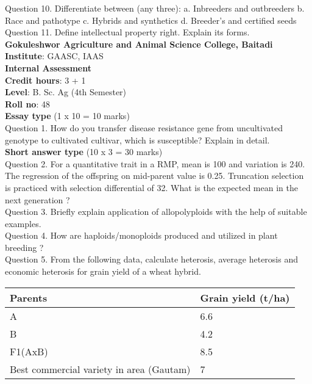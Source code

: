 \documentclass[12pt]{article}\usepackage[]{graphicx}\usepackage[]{color}
\begin{document}
Question 10. Differentiate between (any three): a. Inbreeders and outbreeders b. Race and pathotype c. Hybrids and synthetics d. Breeder's and certified seeds\\
Question 11. Define intellectual property right. Explain its forms.\\
\clearpage 
{\centering \Large{\textbf{Gokuleshwor Agriculture and Animal Science College, Baitadi}} \\[0.25cm]
            \textbf{Institute}: GAASC, IAAS \\[0.2cm]
            \textbf{Internal Assessment} \\[0.2cm]} 
\textbf{Credit hours}: 3 + 1 \\ 
\textbf{Level}: B. Sc. Ag (4th Semester) \\
\textbf{Roll no}: 48 \\[0.5cm] 
\textbf{Essay type} (1 x 10 = 10 marks) \\
Question 1. How do you transfer disease resistance gene from uncultivated genotype to cultivated cultivar, which is susceptible? Explain in detail.\\
\textbf{Short answer type} (10 x 3 = 30 marks) \\
Question 2. For a quantitative trait in a RMP, mean is 100 and variation is 240. The regression of the offspring on mid-parent value is 0.25. Truncation selection is practiced with selection differential of 32. What is the expected mean in the next generation ?\\
Question 3. Briefly explain application of allopolyploids with the help of suitable examples.\\
Question 4. How are haploids/monoploids produced and utilized in plant breeding ?\\
Question 5. From the following data, calculate heterosis, average heterosis and economic heterosis for grain yield of a wheat hybrid.\\ 
\begin{table}[H]
\centering\begingroup\fontsize{8}{10}\selectfont

\begin{tabular}[t]{ll}
\toprule
Parents & Grain yield (t/ha)\\
\midrule
A & 6.6\\
B & 4.2\\
F1(AxB) & 8.5\\
Best commercial variety in area (Gautam) & 7\\
\bottomrule
\end{tabular}
\endgroup{}
\end{table}
\end{document}
